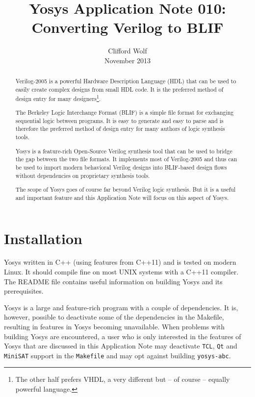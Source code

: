 \documentclass[9pt,technote,a4paper]{IEEEtran}
\begin{document}
\title{Yosys Application Note 010: \\ Converting Verilog to BLIF}
\author{Clifford Wolf \\ November 2013}
\maketitle

\begin{abstract}
Verilog-2005 is a powerful Hardware Description Language (HDL) that can be used
to easily create complex designs from small HDL code. It is the preferred
method of design entry for many designers\footnote{The other half prefers VHDL,
a very different but -- of course -- equally powerful language.}.

The Berkeley Logic Interchange Format (BLIF) is a simple file format for
exchanging sequential logic between programs. It is easy to generate and
easy to parse and is therefore the preferred method of design entry for
many authors of logic synthesis tools.

Yosys \cite{yosys} is a feature-rich
Open-Source Verilog synthesis tool that can be used to bridge the gap between
the two file formats. It implements most of Verilog-2005 and thus can be used
to import modern behavioral Verilog designs into BLIF-based design flows
without dependencies on proprietary synthesis tools.

The scope of Yosys goes of course far beyond Verilog logic synthesis. But
it is a useful and important feature and this Application Note will focus
on this aspect of Yosys.
\end{abstract}

\section{Installation}

Yosys written in C++ (using features from C++11) and is tested on modern Linux.
It should compile fine on most UNIX systems with a C++11 compiler. The README
file contains useful information on building Yosys and its prerequisites.

Yosys is a large and feature-rich program with a couple of dependencies. It is,
however, possible to deactivate some of the dependencies in the Makefile,
resulting in features in Yosys becoming unavailable. When problems with building
Yosys are encountered, a user who is only interested in the features of Yosys
that are discussed in this Application Note may deactivate {\tt TCL}, {\tt Qt}
and {\tt MiniSAT} support in the {\tt Makefile} and may opt against building
{\tt yosys-abc}.
\end{document}
